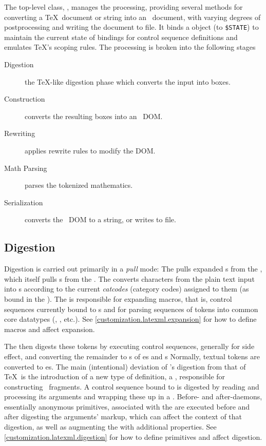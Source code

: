 \documentclass{book}
\begin{document}
The top-level class, , manages the processing, providing several methods
for converting a \TeX\ document or string into an \XML\ document, with varying degrees
of postprocessing and writing the document to file.
It binds a  object (to \verb|$STATE|) to maintain the current state
of bindings for control sequence definitions and emulates \TeX's scoping rules.
The processing is broken into the following stages
\begin{description}
   \item[Digestion] the \TeX-like digestion phase which converts the input into boxes.
   \item[Construction] converts the resulting boxes into an \XML\ DOM.
   \item[Rewriting] applies rewrite rules to modify the DOM.
   \item[Math Parsing] parses the tokenized mathematics.
   \item[Serialization] converts the \XML\ DOM to a string, or writes to file.
\end{description}

\subsection{Digestion}\label{architecture.digestion}
Digestion is carried out primarily in a \emph{pull} mode: The 
pulls expanded s from the , which itself pulls s from 
the .  The  converts characters from the plain text input
into s according to the current \emph{catcodes} (category codes) assigned to
them (as bound in the ).  
The  is responsible for expanding macros,
that is, control sequences currently bound to s
and for parsing sequences of tokens into common core datatypes
(, , etc.).
See \ref{customization.latexml.expansion} for how to define macros
and affect expansion.

The  then digests these tokens by executing  control 
sequences, generally for side effect, and converting the remainder
to s of es and s
Normally, textual tokens are converted to es.
The main (intentional) deviation of \LaTeXML's digestion from that of \TeX\ is
the introduction of a new type of definition, a ,
responsible for constructing \XML\ fragments.
A control sequence bound to  is digested by
reading and processing its arguments and wrapping these up in a .
Before- and after-daemons, essentially anonymous primitives, associated with
the  are executed before and after digesting the 
arguments' markup, which can affect the context of that digestion, as well
as augmenting the  with additional properties.
See \ref{customization.latexml.digestion} for how to define primitives
and affect digestion.
\end{document}
